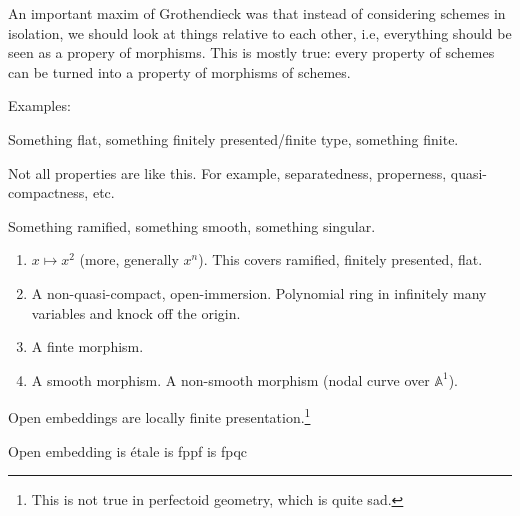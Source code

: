 \documentclass[ignorenonframetext,t]{beamer}
\newcommand{\A}{{\mathbb A}}
\theoremstyle{definition}
\begin{document}
An important maxim of Grothendieck was that instead of considering schemes in isolation, we should look at things relative to each other, i.e, everything should be seen as a propery of morphisms. This is mostly true: every property of schemes can be turned into a property of morphisms of schemes.

Examples:

\begin{frame}
	Something flat, something finitely presented/finite type, something finite.
\end{frame}

\begin{frame}
	Not all properties are like this. For example, separatedness, properness, quasi-compactness, etc.
\end{frame}

\begin{frame}
	Something ramified, something smooth, something singular.
\end{frame}

\begin{enumerate}
	\item $x\mapsto x^2$ (more, generally $x^n$). This covers ramified, finitely presented, flat.
	\item A non-quasi-compact, open-immersion. Polynomial ring in infinitely many variables and knock off the origin.
	\item A finte morphism. 
	\item A smooth morphism. A non-smooth morphism (nodal curve over $\A^1$).
\end{enumerate}

Open embeddings are locally finite presentation.\footnote{This is not true in perfectoid geometry, which is quite sad.}

Open embedding is \'{e}tale is fppf is fpqc




\end{document}
